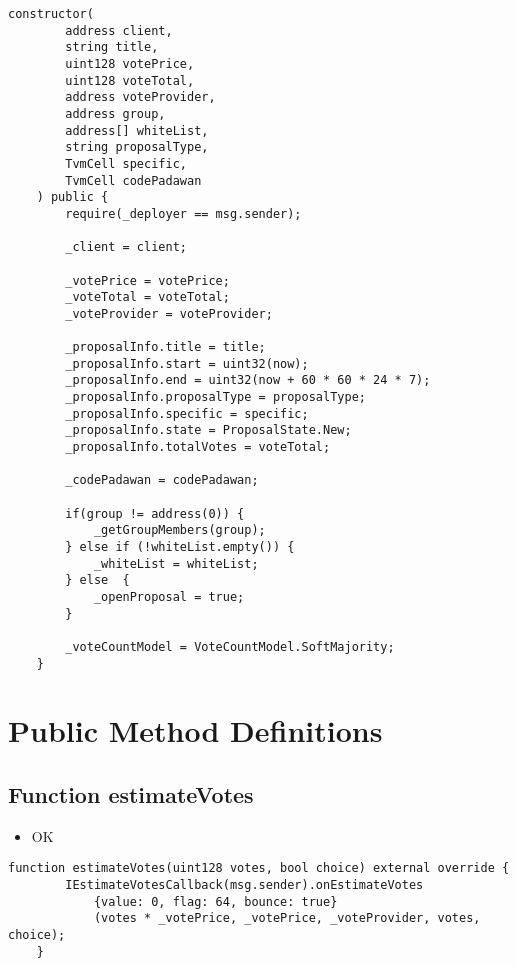 \begin{lstlisting}[firstnumber=32]
    constructor(
        address client,
        string title,
        uint128 votePrice,
        uint128 voteTotal,
        address voteProvider,
        address group,
        address[] whiteList,
        string proposalType,
        TvmCell specific,
        TvmCell codePadawan
    ) public {
        require(_deployer == msg.sender);

        _client = client;

        _votePrice = votePrice;
        _voteTotal = voteTotal;
        _voteProvider = voteProvider;

        _proposalInfo.title = title;
        _proposalInfo.start = uint32(now);
        _proposalInfo.end = uint32(now + 60 * 60 * 24 * 7);
        _proposalInfo.proposalType = proposalType;
        _proposalInfo.specific = specific;
        _proposalInfo.state = ProposalState.New;
        _proposalInfo.totalVotes = voteTotal;

        _codePadawan = codePadawan;

        if(group != address(0)) {
            _getGroupMembers(group);
        } else if (!whiteList.empty()) {
            _whiteList = whiteList;
        } else  {
            _openProposal = true;
        }

        _voteCountModel = VoteCountModel.SoftMajority;
    }
\end{lstlisting}

\section{Public Method Definitions}


\subsection{Function estimateVotes}

\begin{itemize}
\item OK
\end{itemize}

\begin{lstlisting}[firstnumber=78]
    function estimateVotes(uint128 votes, bool choice) external override {
        IEstimateVotesCallback(msg.sender).onEstimateVotes
            {value: 0, flag: 64, bounce: true}
            (votes * _votePrice, _votePrice, _voteProvider, votes, choice);
    }
\end{lstlisting}

